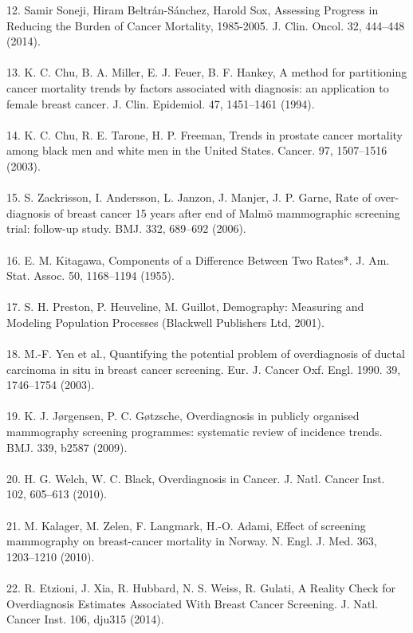 \documentclass[11pt,letterpaper]{article}
\theoremstyle{plain}
\theoremstyle{remark}
\numberwithin{equation}{section}
\begin{document}
12. 	Samir Soneji, Hiram Beltrán-Sánchez, Harold Sox, Assessing Progress in Reducing the Burden of Cancer Mortality, 1985-2005. J. Clin. Oncol. 32, 444–448 (2014).\\\\
13. 	K. C. Chu, B. A. Miller, E. J. Feuer, B. F. Hankey, A method for partitioning cancer mortality trends by factors associated with diagnosis: an application to female breast cancer. J. Clin. Epidemiol. 47, 1451–1461 (1994).\\\\
14. 	K. C. Chu, R. E. Tarone, H. P. Freeman, Trends in prostate cancer mortality among black men and white men in the United States. Cancer. 97, 1507–1516 (2003).\\\\
15. 	S. Zackrisson, I. Andersson, L. Janzon, J. Manjer, J. P. Garne, Rate of over-diagnosis of breast cancer 15 years after end of Malmö mammographic screening trial: follow-up study. BMJ. 332, 689–692 (2006).\\\\
16. 	E. M. Kitagawa, Components of a Difference Between Two Rates*. J. Am. Stat. Assoc. 50, 1168–1194 (1955).\\\\
17. 	S. H. Preston, P. Heuveline, M. Guillot, Demography: Measuring and Modeling Population Processes (Blackwell Publishers Ltd, 2001).\\\\
18. 	M.-F. Yen et al., Quantifying the potential problem of overdiagnosis of ductal carcinoma in situ in breast cancer screening. Eur. J. Cancer Oxf. Engl. 1990. 39, 1746–1754 (2003).\\\\
19. 	K. J. Jørgensen, P. C. Gøtzsche, Overdiagnosis in publicly organised mammography screening programmes: systematic review of incidence trends. BMJ. 339, b2587 (2009).\\\\
20. 	H. G. Welch, W. C. Black, Overdiagnosis in Cancer. J. Natl. Cancer Inst. 102, 605–613 (2010).\\\\
21. 	M. Kalager, M. Zelen, F. Langmark, H.-O. Adami, Effect of screening mammography on breast-cancer mortality in Norway. N. Engl. J. Med. 363, 1203–1210 (2010).\\\\
22. 	R. Etzioni, J. Xia, R. Hubbard, N. S. Weiss, R. Gulati, A Reality Check for Overdiagnosis Estimates Associated With Breast Cancer Screening. J. Natl. Cancer Inst. 106, dju315 (2014).\\\\
\end{document}
